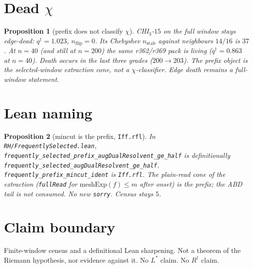\documentclass[11pt]{article}
\newtheorem{prop}{Proposition}
\begin{document}
\section{Dead $\chi$}\label{sec:chi}

\begin{prop}[prefix does not classify $\chi$]\label{prop:chi}
CHI$_3$-$15$ on the \emph{full} window stays
edge-dead: $q^{\dagger}=1.023$, $n_{\mathrm{flip}}=0$.
Its Chebyshev $n_{\mathrm{stab}}$ against
neighbours $14/16$ is $37$.
At $n=40$ (and still at $n=200$) the same
r362/r369 pack is living ($q^{\dagger}=0.863$
at $n=40$).
Death occurs in the last three grades
($200\to 203$).
The prefix object is the selected-window
extraction cone, not a $\chi$-classifier.
Edge death remains a full-window statement.
\end{prop}

\section{Lean naming}\label{sec:lean}

\begin{prop}[mincut is the prefix, \texttt{Iff.rfl}]\label{prop:lean}
In \texttt{RH/FrequentlySelected.lean},
\texttt{frequently\_selected\_prefix\_augDualResolvent\_ge\_half}
is definitionally
\texttt{frequently\_selected\_augDualResolvent\_ge\_half}.
\texttt{frequently\_prefix\_mincut\_ident} is
\texttt{Iff.rfl}.
The plain-read cone of the extraction
(\texttt{fullRead} for $\mathrm{meshExp}(f)\le m$
after onset) \emph{is} the prefix; the ABD tail
is not consumed.
No new \texttt{sorry}.  Census stays $5$.
\end{prop}

\section{Claim boundary}

Finite-window census and a definitional Lean
sharpening.  Not a theorem of the Riemann
hypothesis, nor evidence against it.
No $L^{*}$ claim.  No $R^{\dagger}$ claim.
\end{document}
